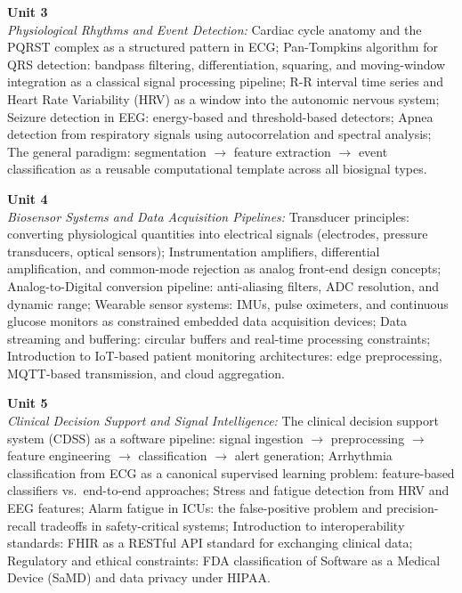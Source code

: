 \noindent\textbf{Unit 3} \\
\textit{Physiological Rhythms and Event Detection:} Cardiac cycle anatomy and the PQRST complex as a structured pattern in ECG; Pan-Tompkins algorithm for QRS detection: bandpass filtering, differentiation, squaring, and moving-window integration as a classical signal processing pipeline; R-R interval time series and Heart Rate Variability (HRV) as a window into the autonomic nervous system; Seizure detection in EEG: energy-based and threshold-based detectors; Apnea detection from respiratory signals using autocorrelation and spectral analysis; The general paradigm: segmentation $\rightarrow$ feature extraction $\rightarrow$ event classification as a reusable computational template across all biosignal types.

\vspace{0.3cm}

\noindent\textbf{Unit 4} \\
\textit{Biosensor Systems and Data Acquisition Pipelines:} Transducer principles: converting physiological quantities into electrical signals (electrodes, pressure transducers, optical sensors); Instrumentation amplifiers, differential amplification, and common-mode rejection as analog front-end design concepts; Analog-to-Digital conversion pipeline: anti-aliasing filters, ADC resolution, and dynamic range; Wearable sensor systems: IMUs, pulse oximeters, and continuous glucose monitors as constrained embedded data acquisition devices; Data streaming and buffering: circular buffers and real-time processing constraints; Introduction to IoT-based patient monitoring architectures: edge preprocessing, MQTT-based transmission, and cloud aggregation.

\vspace{0.3cm}

\noindent\textbf{Unit 5} \\
\textit{Clinical Decision Support and Signal Intelligence:} The clinical decision support system (CDSS) as a software pipeline: signal ingestion $\rightarrow$ preprocessing $\rightarrow$ feature engineering $\rightarrow$ classification $\rightarrow$ alert generation; Arrhythmia classification from ECG as a canonical supervised learning problem: feature-based classifiers vs.\ end-to-end approaches; Stress and fatigue detection from HRV and EEG features; Alarm fatigue in ICUs: the false-positive problem and precision-recall tradeoffs in safety-critical systems; Introduction to interoperability standards: FHIR as a RESTful API standard for exchanging clinical data; Regulatory and ethical constraints: FDA classification of Software as a Medical Device (SaMD) and data privacy under HIPAA.

\newpage
{}
